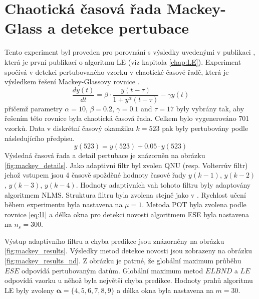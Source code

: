 \section{Chaotická časová řada Mackey-Glass a detekce pertubace}\label{chap:mdpi_mg}
Tento experiment byl proveden pro porovnání s výsledky uvedenými v publikaci \cite{ivoLE1}, která je první publikací o algoritmu LE (viz kapitola \ref{chap:LE}). Experiment spočívá v detekci pertubovaného vzorku v chaotické časové řadě, která je výsledkem řešení Mackey-Glassovy rovnice \cite{mackey}.
\begin{equation}
    \frac{dy(t)}{dt}= \beta \cdot \frac{ y(t-\tau)}{1 + y^\alpha(t-\tau)} - \gamma y(t)
\end{equation}
přičemž parametry $\alpha = 10$, $\beta = 0.2$, $\gamma = 0.1$ and $\tau = 17$ byly vybrány tak, aby řešením této rovnice byla chaotická časová řada. Celkem bylo vygenerováno 701 vzorků. Data v diskrétní časový okamžiku $k=523$ pak byly pertubovány podle následujícího předpisu.
\begin{equation}
    y(523) = y(523) + 0.05 \cdot y(523)
\end{equation}
Výsledná časová řada a detail pertubace je znázorněn na obrázku \ref{fig:mackey_details}. Jako adaptivní filtr byl zvolen QNU (resp. Volterrův filtr) jehož vstupem jsou 4 časově spožděné hodnoty časové řady $y(k-1)$, $y(k-2)$, $y(k-3)$, $y(k-4)$. Hodnoty adaptivních vah tohoto filtru byly adaptovány algoritmem NLMS. Struktura filtru byla zvolena stejně jako v \cite{ivoLE1}. Rychlost učení během experimentu byla nastavena na $\mu=1$. Metoda POT byla zvolena podle rovnice \ref{eq:l1} a délka okna pro detekci novosti algoritmem ESE byla nastavena na $n_s=300$. 
\par 
Výstup adaptivního filtru a chyba predikce jsou znázorněny na obrázku \ref{fig:mackey_results}. Výsledky metod detekce novosti jsou zobrazeny na obrázku \ref{fig:mackey_results_nd}. Z obrázku je patrné, že globální maximum průběhu $ESE$ odpovídá pertubovaným datům. Globální maximum metod $ELBND$ a $LE$ odpovídá vzorku u něhož byla největší chyba predikce. Hodnoty prahů algoritmu LE byly zvoleny $\boldsymbol{\alpha}=\{4,5,6,7,8,9\}$ a délka okna byla nastavena na $m=30$.


